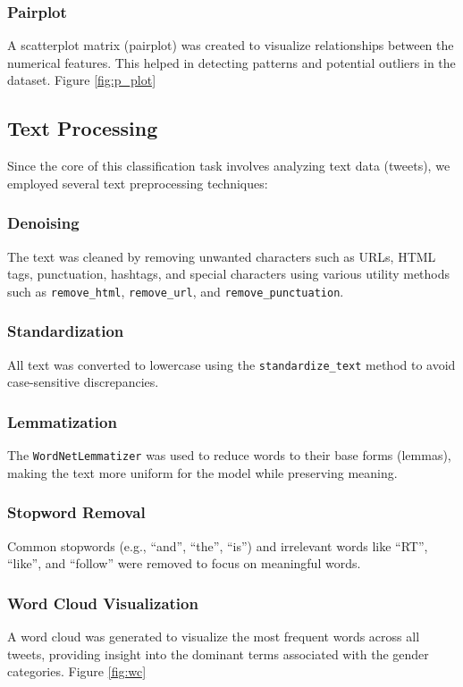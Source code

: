 \documentclass[a4paper,11pt]{article}
\begin{document}
\subsubsection{Pairplot}
A scatterplot matrix (pairplot) was created to visualize relationships between the numerical features. This helped in detecting patterns and potential outliers in the dataset. Figure \ref{fig:p_plot}

\subsection{Text Processing}
Since the core of this classification task involves analyzing text data (tweets), we employed several text preprocessing techniques:

\subsubsection{Denoising}
The text was cleaned by removing unwanted characters such as URLs, HTML tags, punctuation, hashtags, and special characters using various utility methods such as \texttt{remove\_html}, \texttt{remove\_url}, and \texttt{remove\_punctuation}.

\subsubsection{Standardization}
All text was converted to lowercase using the \texttt{standardize\_text} method to avoid case-sensitive discrepancies.

\subsubsection{Lemmatization}
The \texttt{WordNetLemmatizer} was used to reduce words to their base forms (lemmas), making the text more uniform for the model while preserving meaning.

\subsubsection{Stopword Removal}
Common stopwords (e.g., ``and'', ``the'', ``is'') and irrelevant words like ``RT'', ``like'', and ``follow'' were removed to focus on meaningful words.

\subsubsection{Word Cloud Visualization}
A word cloud was generated to visualize the most frequent words across all tweets, providing insight into the dominant terms associated with the gender categories. Figure \ref{fig:wc}
\end{document}
